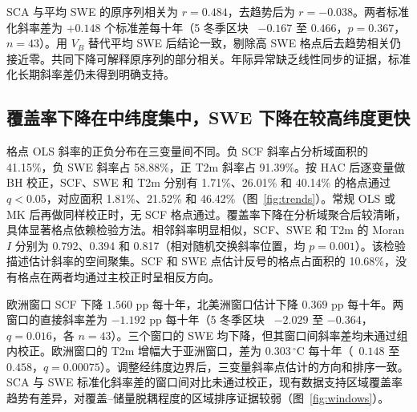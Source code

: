 SCA 与平均 SWE 的原序列相关为 $r=0.484$，去趋势后为 $r=-0.038$。两者标准化斜率差为 $+0.148$ 个标准差每十年（5 冬季区块 \CI\ $-0.167$ 至 $0.466$，$p=0.367$，$n=43$）。用 $V_B$ 替代平均 SWE 后结论一致，剔除高 SWE 格点后去趋势相关仍接近零。共同下降可解释原序列的部分相关。年际异常缺乏线性同步的证据，标准化长期斜率差仍未得到明确支持。

\subsection{覆盖率下降在中纬度集中，SWE 下降在较高纬度更快}

格点 OLS 斜率的正负分布在三变量间不同。负 SCF 斜率占分析域面积的 41.15\%，负 SWE 斜率占 58.88\%，正 T2m 斜率占 91.39\%。按 HAC 后逐变量做 BH 校正，SCF、SWE 和 T2m 分别有 1.71\%、26.01\% 和 40.14\% 的格点通过 $q<0.05$，对应面积 1.81\%、21.52\% 和 46.42\%（图~\ref{fig:trends}）。常规 OLS 或 MK 后再做同样校正时，无 SCF 格点通过。覆盖率下降在分析域聚合后较清晰，具体显著格点依赖检验方法。相邻斜率明显相似，SCF、SWE 和 T2m 的 Moran $I$ 分别为 0.792、0.394 和 0.817（相对随机交换斜率位置，均 $p=0.001$）。该检验描述估计斜率的空间聚集。SCF 和 SWE 点估计反号的格点占面积的 10.68\%，没有格点在两者均通过主校正时呈相反方向。


欧洲窗口 SCF 下降 $1.560$ pp 每十年，北美洲窗口估计下降 $0.369$ pp 每十年。两窗口的直接斜率差为 $-1.192$ pp 每十年（5 冬季区块 \CI\ $-2.029$ 至 $-0.364$，$q=0.016$，各 $n=43$）。三个窗口的 SWE 均下降，但其窗口间斜率差均未通过组内校正。欧洲窗口的 T2m 增幅大于亚洲窗口，差为 $0.303\,^\circ$C 每十年（\CI\ $0.148$ 至 $0.458$，$q=0.00075$）。调整经纬度边界后，三变量斜率点估计的方向和排序一致。SCA 与 SWE 标准化斜率差的窗口间对比未通过校正，现有数据支持区域覆盖率趋势有差异，对覆盖--储量脱耦程度的区域排序证据较弱（图~\ref{fig:windows}）。



